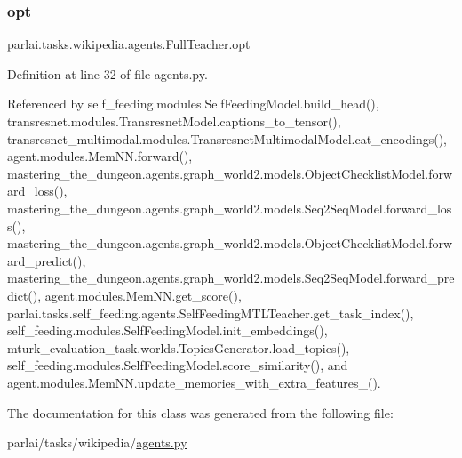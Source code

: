 \mbox{\label{classparlai_1_1tasks_1_1wikipedia_1_1agents_1_1FullTeacher_aa4ceed492ea802e93be6cad4f5a7b322}} 
\subsubsection{\texorpdfstring{opt}{opt}}
{\footnotesize\ttfamily parlai.\+tasks.\+wikipedia.\+agents.\+Full\+Teacher.\+opt}



Definition at line 32 of file agents.\+py.



Referenced by self\+\_\+feeding.\+modules.\+Self\+Feeding\+Model.\+build\+\_\+head(), transresnet.\+modules.\+Transresnet\+Model.\+captions\+\_\+to\+\_\+tensor(), transresnet\+\_\+multimodal.\+modules.\+Transresnet\+Multimodal\+Model.\+cat\+\_\+encodings(), agent.\+modules.\+Mem\+N\+N.\+forward(), mastering\+\_\+the\+\_\+dungeon.\+agents.\+graph\+\_\+world2.\+models.\+Object\+Checklist\+Model.\+forward\+\_\+loss(), mastering\+\_\+the\+\_\+dungeon.\+agents.\+graph\+\_\+world2.\+models.\+Seq2\+Seq\+Model.\+forward\+\_\+loss(), mastering\+\_\+the\+\_\+dungeon.\+agents.\+graph\+\_\+world2.\+models.\+Object\+Checklist\+Model.\+forward\+\_\+predict(), mastering\+\_\+the\+\_\+dungeon.\+agents.\+graph\+\_\+world2.\+models.\+Seq2\+Seq\+Model.\+forward\+\_\+predict(), agent.\+modules.\+Mem\+N\+N.\+get\+\_\+score(), parlai.\+tasks.\+self\+\_\+feeding.\+agents.\+Self\+Feeding\+M\+T\+L\+Teacher.\+get\+\_\+task\+\_\+index(), self\+\_\+feeding.\+modules.\+Self\+Feeding\+Model.\+init\+\_\+embeddings(), mturk\+\_\+evaluation\+\_\+task.\+worlds.\+Topics\+Generator.\+load\+\_\+topics(), self\+\_\+feeding.\+modules.\+Self\+Feeding\+Model.\+score\+\_\+similarity(), and agent.\+modules.\+Mem\+N\+N.\+update\+\_\+memories\+\_\+with\+\_\+extra\+\_\+features\+\_\+().



The documentation for this class was generated from the following file\+:\begin{DoxyCompactItemize}
\item 
parlai/tasks/wikipedia/\hyperlink{parlai_2tasks_2wikipedia_2agents_8py}{agents.\+py}\end{DoxyCompactItemize}
